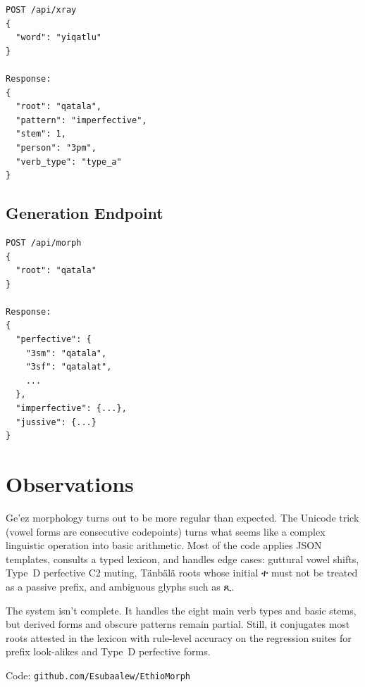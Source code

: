 \documentclass[conference]{IEEEtran}
\newcommand{\geez}[1]{{\ethiopicfont #1}}
\begin{document}
\begin{lstlisting}
POST /api/xray
{
  "word": "yiqatlu"
}

Response:
{
  "root": "qatala",
  "pattern": "imperfective",
  "stem": 1,
  "person": "3pm",
  "verb_type": "type_a"
}
\end{lstlisting}

\subsection{Generation Endpoint}

\begin{lstlisting}
POST /api/morph
{
  "root": "qatala"
}

Response:
{
  "perfective": {
    "3sm": "qatala",
    "3sf": "qatalat",
    ...
  },
  "imperfective": {...},
  "jussive": {...}
}
\end{lstlisting}

\section{Observations}

Ge'ez morphology turns out to be more regular than expected. The Unicode trick (vowel forms are consecutive codepoints) turns what seems like a complex linguistic operation into basic arithmetic. Most of the code applies JSON templates, consults a typed lexicon, and handles edge cases: guttural vowel shifts, Type~D perfective C2 muting, Tänbälä roots whose initial \geez{ተ} must not be treated as a passive prefix, and ambiguous glyphs such as \geez{ጺ}.

The system isn't complete. It handles the eight main verb types and basic stems, but derived forms and obscure patterns remain partial. Still, it conjugates most roots attested in the lexicon with rule-level accuracy on the regression suites for prefix look-alikes and Type~D perfective forms.

Code: \texttt{github.com/Esubaalew/EthioMorph}
\end{document}
